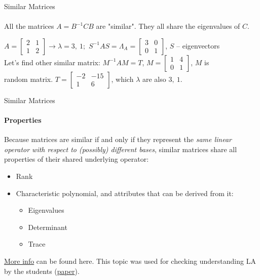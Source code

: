\documentclass[aspectratio=169]{beamer}
\begin{document}
\begin{frame}[t]{Similar Matrices}
\framesubtitle{}
    \LARGE
    \centering
    All the matrices $A=B^{-1}CB$ are "similar". They all share the eigenvalues of $C$. \\
    \begin{example}
        \Large
        $A = \begin{bmatrix}
        2 & 1\\ 
        1 & 2 
        \end{bmatrix} \rightarrow \lambda =3,\ 1;$  $S^{-1}AS=\Lambda_{A} = \begin{bmatrix}
        3 & 0\\ 
        0 & 1 
        \end{bmatrix}$, $S$ -- eigenvectors \\ 
        \vspace{-0.4cm}
        Let's find other similar matrix: $M^{-1}AM=T$, $M=\begin{bmatrix}
        1 & 4\\ 
        0 & 1 
        \end{bmatrix}$, $M$ is \\ 
        \vspace{-0.4cm}
        random matrix. $T = \begin{bmatrix}
        -2 & -15\\ 
        1 & 6 
        \end{bmatrix}$, which $\lambda$ are also $3,\ 1$.
    \end{example}
\end{frame}

\begin{frame}[t]{Similar Matrices}
\framesubtitle{Properties}
Because matrices are similar if and only if they represent the \textit{same linear operator with respect to (possibly) different bases}, similar matrices share all properties of their shared underlying operator:
\begin{itemize}
    \item Rank
    \item Characteristic polynomial, and attributes that can be derived from it: \begin{itemize}
        \item Eigenvalues
        \item Determinant
        \item Trace
    \end{itemize}
\end{itemize}

\href{https://en.wikipedia.org/wiki/Matrix_similarity}{More info} can be found here. This topic was used for checking understanding LA by the students (\href{https://www.tandfonline.com/doi/full/10.1080/07380569.2018.1491774}{paper}).

\end{frame}
\end{document}
